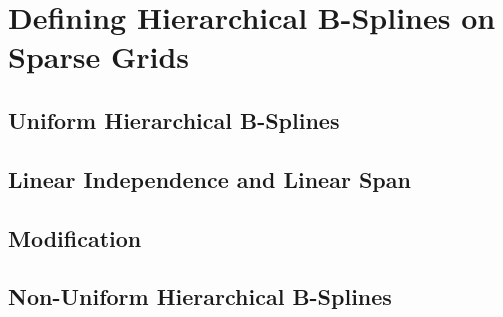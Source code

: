 \section{Defining Hierarchical B-Splines on Sparse Grids}
\label{sec:22bSplines}


\blindtext{}

\subsection{Uniform Hierarchical B-Splines}


\blindtext{}

\subsection{Linear Independence and Linear Span}


\blindtext{}

\subsection{Modification}


\blindtext{}

\subsection{Non-Uniform Hierarchical B-Splines}


\blindtext{}
